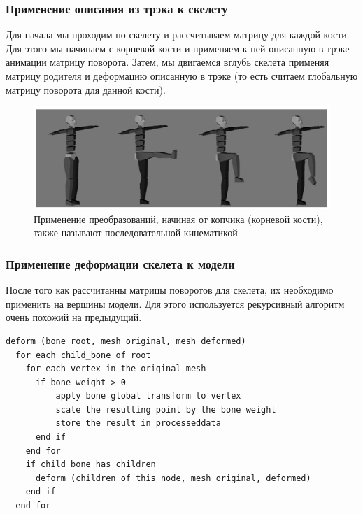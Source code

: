 \documentclass{beamer}
\begin{document}
\begin{frame}
\frametitle{Применение описания из трэка к скелету}
\begin{scriptsize}
    Для начала мы проходим по скелету и рассчитываем матрицу для каждой кости. Для этого мы начинаем с корневой кости и применяем к ней описанную в трэке анимации матрицу поворота. Затем, мы двигаемся вглубь скелета применяя матрицу родителя и деформацию описанную в трэке (то есть считаем глобальную матрицу поворота для данной кости).
    
\begin{figure}[h!]
    \centering
    \includegraphics[width=1\textwidth]{forward_kinematics.png}
    \caption{\scriptsize{Применение преобразований, начиная от копчика (корневой кости), также называют последовательной кинематикой}}
\end{figure}

\end{scriptsize}
\end{frame}


\begin{frame}[fragile]
\frametitle{Применение деформации скелета к модели}

После того как рассчитанны матрицы поворотов для скелета, их необходимо применить на вершины модели. Для этого используется рекурсивный алгоритм очень похожий на предыдущий.

\begin{scriptsize}
\begin{lstlisting}
deform (bone root, mesh original, mesh deformed)
  for each child_bone of root
    for each vertex in the original mesh
      if bone_weight > 0
          apply bone global transform to vertex
          scale the resulting point by the bone weight
          store the result in processeddata
      end if
    end for
    if child_bone has children
      deform (children of this node, mesh original, deformed)
    end if
  end for
\end{lstlisting}
\end{scriptsize}


\end{frame}
\end{document}
